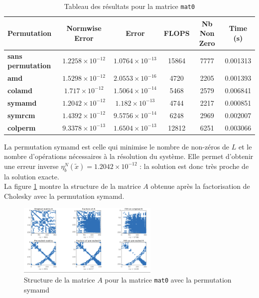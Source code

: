\documentclass[12pt,a4paper]{article}
\begin{document}
\begin{table}[H]
    \centering
    \begin{tabular}{|l|c|c|c|c|c|}
    \hline
    \rowcolor{gray!20} \textbf{Permutation} & \textbf{Normwise Error} & \textbf{Error} & \textbf{FLOPS} & \textbf{Nb Non Zero} & \textbf{Time (s)} \\
    \hline
    \textbf{\textsf{sans permutation}} & $1.2258 \times 10^{-12}$ & $1.0764 \times 10^{-13}$ & 15864 & 7777 & 0.001313 \\
    \hline
    \textbf{\textsf{amd}} & $1.5298 \times 10^{-12}$ & $2.0553 \times 10^{-16}$ & 4720 & 2205 & 0.001393 \\
    \hline
    \textbf{\textsf{colamd}} & $1.717 \times 10^{-12}$ & $1.5064 \times 10^{-14}$ & 5468 & 2579 & 0.006841 \\
    \hline
    \textbf{\textsf{symamd}} & $1.2042 \times 10^{-12}$ & $1.182 \times 10^{-13}$ & 4744 & 2217 & 0.000851 \\
    \hline
    \textbf{\textsf{symrcm}} & $1.4392 \times 10^{-12}$ & $9.5756 \times 10^{-14}$ & 6248 & 2969 & 0.002007 \\
    \hline
    \textbf{\textsf{colperm}} & $9.3378 \times 10^{-13}$ & $1.6504 \times 10^{-13}$ & 12812 & 6251 & 0.003066 \\
    \hline
    \end{tabular}
    \caption{Tableau des résultats pour la matrice \texttt{mat0}}
\end{table}

La permutation \textsf{symamd} est celle qui minimise le nombre de non-zéros de $L$ et le nombre d'opérations nécessaires à la résolution du système.
Elle permet d'obtenir une erreur inverse $\eta_b^N(\tilde{x}) = 1.2042 \times 10^{-12}$ : la solution est donc très proche de la solution exacte. \\

La figure \ref{fig:mat0} montre la structure de la matrice $A$ obtenue après la factorisation de Cholesky avec la permutation \textsf{symamd}.

\begin{figure}[H]
    \centering
    \includegraphics[width=0.6\textwidth]{src/mat0_symamd.png}
    \caption{Structure de la matrice $A$ pour la matrice \texttt{mat0} avec la permutation \textsf{symamd}}
    \label{fig:mat0}
\end{figure}
\end{document}
